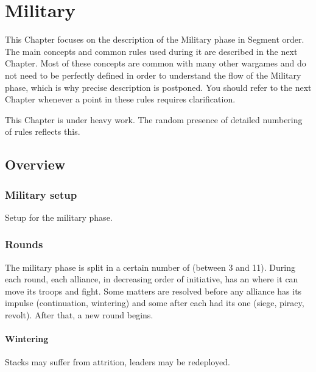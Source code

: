 
\chapter{Military}\label{chapter:MilitaryRules}

\begin{designnote}
  This Chapter focuses on the description of the Military phase in Segment
  order. The main concepts and common rules used during it are described in
  the next Chapter. Most of these concepts are common with many other wargames
  and do not need to be perfectly defined in order to understand the flow of
  the Military phase, which is why precise description is postponed. You
  should refer to the next Chapter whenever a point in these rules requires
  clarification.
\end{designnote}

\begin{todo}
  This Chapter is under heavy work. The random presence of detailed numbering
  of rules reflects this.
\end{todo}

\section{Overview}
\aparag[Sequence]
\MilitaryDetails

\subsection{Military setup}
Setup for the military phase.

\subsection{Rounds}
The military phase is split in a certain number of  (between 3
and 11). During each round, each alliance, in decreasing order of initiative,
has an  where it can move its troops and fight. Some matters
are resolved before any alliance has its impulse (continuation, wintering) and
some after each had its one (siege, piracy, revolt). After that, a new round
begins.

\subsubsection{Wintering}
Stacks may suffer from attrition, leaders may be redeployed.

